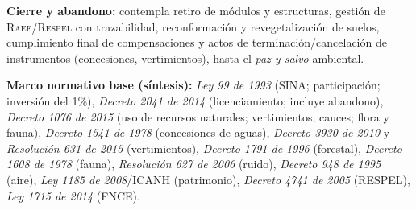 \medskip

\textbf{Cierre y abandono:} contempla retiro de módulos y estructuras, gestión de \textsc{Raee}/\textsc{Respel} con trazabilidad, reconformación y revegetalización de suelos, cumplimiento final de compensaciones y actos de terminación/cancelación de instrumentos (concesiones, vertimientos), hasta el \textit{paz y salvo} ambiental.

\medskip

\textbf{Marco normativo base (síntesis):} \textit{Ley 99 de 1993} (SINA; participación; inversión del 1\%), \textit{Decreto 2041 de 2014} (licenciamiento; incluye abandono), \textit{Decreto 1076 de 2015} (uso de recursos naturales; vertimientos; cauces; flora y fauna), \textit{Decreto 1541 de 1978} (concesiones de aguas), \textit{Decreto 3930 de 2010} y \textit{Resolución 631 de 2015} (vertimientos), \textit{Decreto 1791 de 1996} (forestal), \textit{Decreto 1608 de 1978} (fauna), \textit{Resolución 627 de 2006} (ruido), \textit{Decreto 948 de 1995} (aire), \textit{Ley 1185 de 2008}/ICANH (patrimonio), \textit{Decreto 4741 de 2005} (RESPEL), \textit{Ley 1715 de 2014} (FNCE).
